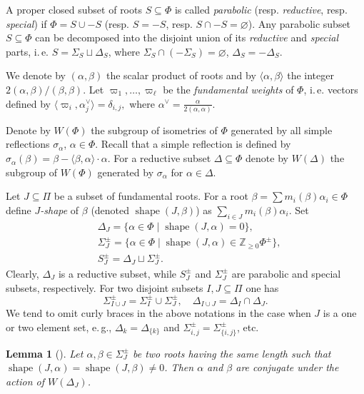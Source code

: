 \documentclass[oneside, 12pt]{amsart}
\theoremstyle{plain}
\numberwithin{equation}{section}
\newtheorem{lemma}{Lemma}
\numberwithin{lemma}{section}
\theoremstyle{definition}
\theoremstyle{remark}
\DeclareMathOperator{\shape}{shape}
\begin{document}
A proper closed subset of roots $S\subseteq \Phi$ is called {\it parabolic} (resp. {\it reductive}, resp. {\it special}) if $\Phi=S \cup -S$ (resp. $S = -S$, resp. $S \cap -S=\varnothing$).
Any parabolic subset $S \subseteq \Phi$ can be decomposed into the disjoint union of its \emph{reductive} and \emph{special} parts, i.\,e. 
$S = \Sigma_S \sqcup \Delta_S$, where $\Sigma_S \cap (-\Sigma_S) = \varnothing$, $\Delta_S = -\Delta_S$.

We denote by $(\alpha, \beta)$ the scalar product of roots and by $\langle \alpha, \beta\rangle$ the integer $2(\alpha, \beta)/(\beta, \beta)$.
Let $\varpi_1, \ldots, \varpi_\ell$ be the \emph{fundamental weights }of $\Phi$, i.\,e. vectors
defined by $\langle\varpi_i, \alpha_j^\vee\rangle=\delta_{i, j}, $ where $\alpha^\vee = \frac{\alpha}{2(\alpha, \alpha)}$.

Denote by $W(\Phi)$ the subgroup of isometries of $\Phi$ generated by all simple reflections $\sigma_\alpha$, $\alpha\in\Phi$. Recall that a simple reflection is defined by $\sigma_\alpha(\beta)=\beta-\langle\beta, \alpha \rangle\cdot \alpha$.
For a reductive subset $\Delta\subseteq \Phi$ denote by $W(\Delta)$ the subgroup of $W(\Phi)$ generated by $\sigma_\alpha$ for $\alpha\in\Delta$.

Let $J\subseteq \Pi$ be a subset of fundamental roots. 
For a root $\beta = \sum m_i(\beta)\alpha_i \in \Phi$ define \emph{$J$-shape} of $\beta$ (denoted $\shape(J, \beta)$) as $\sum_{i\in J} m_i(\beta) \alpha_i$.
Set
\begin{align*}
& \Delta_J = \{\alpha \in \Phi \mid \shape(J, \alpha)=0\}, \\
& \Sigma^\pm_J = \{\alpha \in \Phi \mid \shape(J, \alpha) \in \mathbb{Z}_{\geqslant0} \Phi^\pm \}, \\
& S_J^\pm = \Delta_J \sqcup \Sigma_J^\pm.
\end{align*}
Clearly, $\Delta_J$ is a reductive subset, while $S^\pm_J$ and $\Sigma^\pm_J$ are parabolic and special subsets, respectively.
For two disjoint subsets $I, J\subseteq \Pi$ one has 
\[ \Sigma^\pm_{I \cup J} = \Sigma^\pm_I\cup\Sigma^\pm_J, \quad \Delta_{I\cup J} = \Delta_I \cap \Delta_J. \]
We tend to omit curly braces in the above notations in the case when $J$ is a one or two element set, e.\,g., $\Delta_k=\Delta_{\{k\}}$ and $\Sigma_{i, j}^\pm=\Sigma_{\{i, j\}}^\pm$, etc.

\begin{lemma}[{\cite[Lemma~1]{ABS}}]\label{lemma:abs}
Let $\alpha, \beta \in \Sigma^\pm_J$ be two roots having the same length such that $\shape(J, \alpha)=\shape(J, \beta)\neq 0$.
Then $\alpha$ and $\beta$ are conjugate under the action of $W(\Delta_J)$.
\end{lemma}
\end{document}
